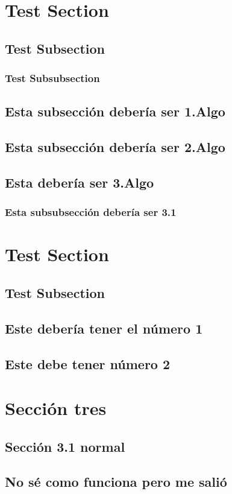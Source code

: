\section{Test Section}

\subsection{Test Subsection}
\subsubsection{Test Subsubsection}


\subsection{Esta subsección debería ser 1.Algo}
\subsection{Esta subsección debería ser 2.Algo}
\subsection{Esta debería ser 3.Algo}
\subsubsection{Esta subsubsección debería ser 3.1}

\section{Test Section}

\subsection{Test Subsection}


\subsection{Este debería tener el número 1}
\subsection{Este debe tener número 2}

\section{Sección tres}
\subsection{Sección 3.1 normal}
\subsection{No sé como funciona pero me salió}